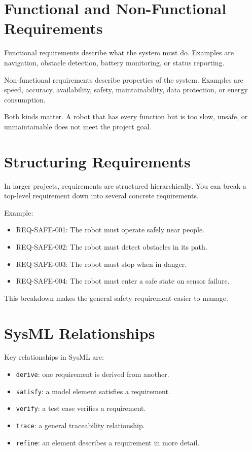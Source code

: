 \section{Functional and Non-Functional Requirements}
Functional requirements describe what the system must do. Examples are navigation, obstacle detection, battery monitoring, or status reporting.

Non-functional requirements describe properties of the system. Examples are speed, accuracy, availability, safety, maintainability, data protection, or energy consumption.

Both kinds matter. A robot that has every function but is too slow, unsafe, or unmaintainable does not meet the project goal.

\section{Structuring Requirements}
In larger projects, requirements are structured hierarchically. You can break a top-level requirement down into several concrete requirements.

Example:

\begin{itemize}
    \item REQ-SAFE-001: The robot must operate safely near people.
    \item REQ-SAFE-002: The robot must detect obstacles in its path.
    \item REQ-SAFE-003: The robot must stop when in danger.
    \item REQ-SAFE-004: The robot must enter a safe state on sensor failure.
\end{itemize}

This breakdown makes the general safety requirement easier to manage.

\section{SysML Relationships}
Key relationships in SysML are:

\begin{itemize}
    \item \texttt{derive}: one requirement is derived from another.
    \item \texttt{satisfy}: a model element satisfies a requirement.
    \item \texttt{verify}: a test case verifies a requirement.
    \item \texttt{trace}: a general traceability relationship.
    \item \texttt{refine}: an element describes a requirement in more detail.
\end{itemize}

